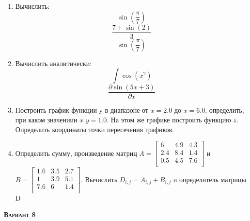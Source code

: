 \begin{enumerate}
\item Вычислить: 
\begin{equation*}\sin \left( \dfrac{\pi}{7} \right)\end{equation*}
\begin{equation*}\dfrac{7+\sin(2)}{3}              \end{equation*}
\begin{equation*}\sin \left( \dfrac{\pi}{7} \right)\end{equation*}

\item Вычислить аналитически: 
 \begin{equation*} \int \cos(x^2)          \end{equation*}\begin{equation*} {\dfrac{\partial \sin(5 x +3)}{\partial x}} \end{equation*}
\item Построить график функции y в диапазоне от $x=2.0$ до $x=6.0$, определить, при каком значениии $x$ $y=1.0$. На этом же графике построить функцию $z $. Определить координаты точки пересечения графиков. \item Определить сумму, произведение матриц $A=\begin{bmatrix}
6 &4.9 &4.3 \\
2.4 &8.4 &1.4 \\
0.5 &4.5 &7.6 \\
\end{bmatrix}
$ и $B=\begin{bmatrix}
1.6 &3.5 &2.7 \\
1 &3.9 &5.1 \\
7.6 &6 &1.4 \\
\end{bmatrix}
$. Вычислить $D_{i,j}=A_{i,j} + B_{i,j}$ и определитель матрицы D
\end{enumerate}
\textsc{\textbf{Вариант 8}}

